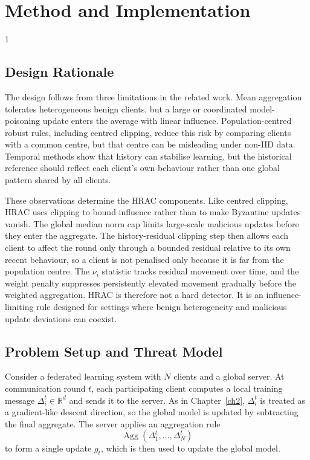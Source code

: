 \doublespacing %

\chapter{Method and Implementation}
\label{ch:method-implementation}

\begin{spacing}{1}
\minitoc
\end{spacing}
\thesisspacing

\section{Design Rationale}

The design follows from three limitations in the related work. Mean aggregation
tolerates heterogeneous benign clients, but a large or coordinated
model-poisoning update enters the average with linear influence.
Population-centred robust rules, including centred clipping, reduce this risk
by comparing clients with a common centre, but that centre can be misleading
under non-IID data. Temporal methods show that history can stabilise learning,
but the historical reference should reflect each client's own behaviour rather
than one global pattern shared by all clients.

These observations determine the HRAC components. Like centred clipping, HRAC
uses clipping to bound influence rather than to make Byzantine updates vanish.
The global median norm cap limits large-scale malicious updates before they
enter the aggregate. The history-residual clipping step then allows each client
to affect the round only through a bounded residual relative to its own recent
behaviour, so a client is not penalised only because it is far from the
population centre. The \(\nu_i\) statistic tracks residual movement over time,
and the weight penalty suppresses persistently elevated movement
gradually before the weighted aggregation. HRAC is therefore not a hard
detector. It is an influence-limiting rule designed for settings where benign
heterogeneity and malicious update deviations can coexist.
\section{Problem Setup and Threat Model}
\label{sec:problem-threat-model}

Consider a federated learning system with $N$ clients and a global
server. At communication round $t$, each participating client computes a local
training message $\Delta_i^t \in \mathbb{R}^d$ and sends it to the server. As
in Chapter~\ref{ch2}, $\Delta_i^t$ is treated as a gradient-like descent
direction, so the global model is updated by subtracting the final aggregate.
The server applies an aggregation rule
\[
    \operatorname{Agg}(\Delta_1^t,\ldots,\Delta_N^t)
\]
to form a single update $g_t$, which is then used to update the global model.

